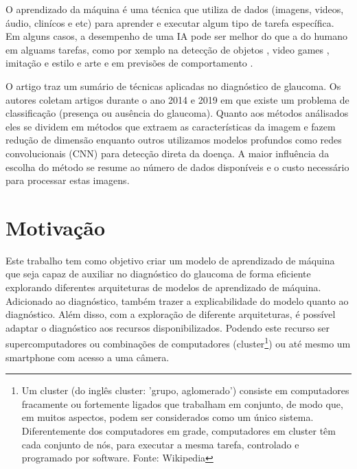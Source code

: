 \documentclass[ %
	msc, %
	portugues %
]{../ppgccufmg}
\begin{document}
        O aprendizado da máquina é uma técnica que utiliza de dados (imagens, videos, áudio,
        clinícos e etc) para aprender e executar algum tipo de tarefa específica. Em alguns casos, a desempenho de uma
        IA pode ser melhor do que a do humano em alguams tarefas, como por xemplo na detecção de objetos \citep{detect}, video
        games \citep{Mnih2015}, imitação e estilo e arte \citep{DBLP:journals/corr/GatysEB15a} e em
        previsões de comportamento \citep{doi:10.1073/pnas.1700035114}.


        O artigo \citep{overview} traz um sumário de técnicas aplicadas no diagnóstico de glaucoma.
        Os autores coletam artigos durante o ano 2014 e 2019 em que existe um problema
        de classificação (presença ou ausência do glaucoma). Quanto aos métodos análisados eles se
        dividem em métodos que extraem as características da imagem e fazem redução de dimensão
        enquanto outros utilizamos modelos profundos como redes
        convolucionais (CNN)\citep{GoodBengCour16} para detecção direta da doença.
        A maior influência da escolha do método se resume ao
        número de dados disponíveis e o custo necessário para processar estas imagens.

		\section{Motivação}

        Este trabalho tem como objetivo criar um modelo de aprendizado de máquina que seja capaz de
        auxiliar no diagnóstico do glaucoma de forma eficiente explorando diferentes arquiteturas de
        modelos de aprendizado de máquina. Adicionado ao diagnóstico,
        também trazer a explicabilidade do modelo quanto ao diagnóstico. Além disso,
        com a exploração de diferente arquiteturas, é possível adaptar o diagnóstico aos recursos
        disponibilizados. Podendo este recurso ser supercomputadores ou combinações de computadores
        (cluster\footnote{Um cluster (do inglês cluster: 'grupo, aglomerado') consiste em
        computadores fracamente ou fortemente ligados que trabalham em conjunto, de modo que, em
        muitos aspectos, podem ser considerados como um único sistema. Diferentemente dos
        computadores em grade, computadores em cluster têm cada conjunto de nós, para executar a
        mesma tarefa, controlado e programado por software. Fonte: Wikipedia}) ou até mesmo um smartphone com acesso a
        uma câmera.
\end{document}
